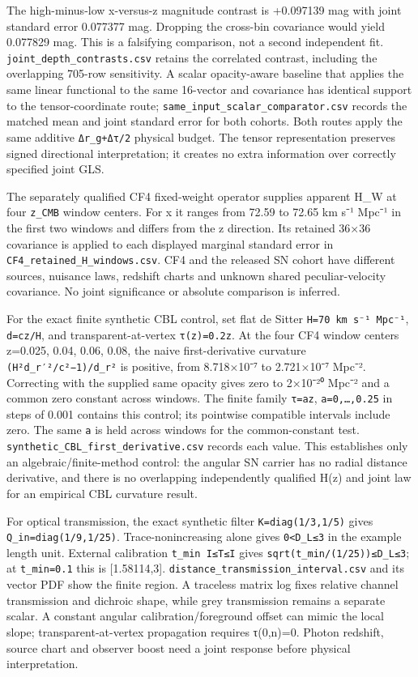 \documentclass[
]{article}
\begin{document}
The high-minus-low x-versus-z magnitude contrast is +0.097139 mag with
joint standard error 0.077377 mag. Dropping the cross-bin covariance
would yield 0.077829 mag. This is a falsifying comparison, not a second
independent fit. \texttt{joint\_depth\_contrasts.csv} retains the
correlated contrast, including the overlapping 705-row sensitivity. A
scalar opacity-aware baseline that applies the same linear functional to
the same 16-vector and covariance has identical support to the
tensor-coordinate route; \texttt{same\_input\_scalar\_comparator.csv}
records the matched mean and joint standard error for both cohorts. Both
routes apply the same additive \texttt{Δr\_g+Δτ/2} physical budget. The
tensor representation preserves signed directional interpretation; it
creates no extra information over correctly specified joint GLS.

The separately qualified CF4 fixed-weight operator supplies apparent
H\_W at four \texttt{z\_CMB} window centers. For x it ranges from 72.59
to 72.65 km s⁻¹ Mpc⁻¹ in the first two windows and differs from the z
direction. Its retained 36×36 covariance is applied to each displayed
marginal standard error in \texttt{CF4\_retained\_H\_windows.csv}. CF4
and the released SN cohort have different sources, nuisance laws,
redshift charts and unknown shared peculiar-velocity covariance. No
joint significance or absolute comparison is inferred.

For the exact finite synthetic CBL control, set flat de Sitter
\texttt{H=70\ km\ s⁻¹\ Mpc⁻¹}, \texttt{d=cz/H}, and
transparent-at-vertex \texttt{τ(z)=0.2z}. At the four CF4 window centers
z=0.025, 0.04, 0.06, 0.08, the naive first-derivative curvature
\texttt{(H²d\_r′²/c²−1)/d\_r²} is positive, from 8.718×10⁻⁷ to
2.721×10⁻⁷ Mpc⁻². Correcting with the supplied same opacity gives zero
to 2×10⁻²⁰ Mpc⁻² and a common zero constant across windows. The finite
family \texttt{τ=az}, \texttt{a=0,…,0.25} in steps of 0.001 contains
this control; its pointwise compatible intervals include zero. The same
\texttt{a} is held across windows for the common-constant test.
\texttt{synthetic\_CBL\_first\_derivative.csv} records each value. This
establishes only an algebraic/finite-method control: the angular SN
carrier has no radial distance derivative, and there is no overlapping
independently qualified H(z) and joint law for an empirical CBL
curvature result.

For optical transmission, the exact synthetic filter
\texttt{K=diag(1/3,1/5)} gives \texttt{Q\_in=diag(1/9,1/25)}.
Trace-nonincreasing alone gives \texttt{0\textless{}D\_L≤3} in the
example length unit. External calibration \texttt{t\_min\ I≤T≤I} gives
\texttt{sqrt(t\_min/(1/25))≤D\_L≤3}; at \texttt{t\_min=0.1} this is
{[}1.58114,3{]}. \texttt{distance\_transmission\_interval.csv} and its
vector PDF show the finite region. A traceless matrix log fixes relative
channel transmission and dichroic shape, while grey transmission remains
a separate scalar. A constant angular calibration/foreground offset can
mimic the local slope; transparent-at-vertex propagation requires
τ(0,n)=0. Photon redshift, source chart and observer boost need a joint
response before physical interpretation.
\end{document}
